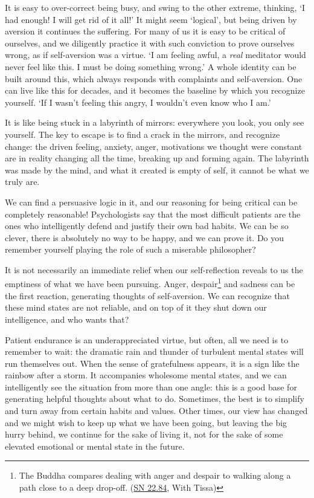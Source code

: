 It is easy to over-correct being busy, and swing to the other extreme,
thinking, `I had enough! I will get rid of it all!' It might seem
`logical', but being driven by aversion it continues the suffering. For
many of us it is easy to be critical of ourselves, and we diligently
practice it with such conviction to prove ourselves wrong, as if
self-aversion was a virtue. `I am feeling awful, a \emph{real} meditator
would never feel like this. I must be doing something wrong.' A whole
identity can be built around this, which always responds with complaints
and self-aversion. One can live like this for decades, and it becomes
the baseline by which you recognize yourself. `If I wasn't feeling this
angry, I wouldn't even know who I am.'

It is like being stuck in a labyrinth of mirrors: everywhere you look,
you only see yourself. The key to escape is to find a crack in the
mirrors, and recognize change: the driven feeling, anxiety, anger,
motivations we thought were constant are in reality changing all the
time, breaking up and forming again. The labyrinth was made by the mind,
and what it created is empty of self, it cannot be what we truly are.

We can find a persuasive logic in it, and our reasoning for being
critical can be completely reasonable! Psychologists say that the most
difficult patients are the ones who intelligently defend and justify
their own bad habits. We can be so clever, there is absolutely no way to
be happy, and we can prove it. Do you remember yourself playing the role
of such a miserable philosopher?

It is not necessarily an immediate relief when our self-reflection
reveals to us the emptiness of what we have been pursuing. Anger,
despair\footnote{The Buddha compares dealing with anger and despair to
  walking along a path close to a deep drop-off.
  (\href{https://suttacentral.net/sn22.84}{SN 22.84}, With Tissa)} and
sadness can be the first reaction, generating thoughts of self-aversion.
We can recognize that these mind states are not reliable, and on top of
it they shut down our intelligence, and who wants that?


Patient endurance is an underappreciated virtue, but often, all we need
is to remember to wait: the dramatic rain and thunder of turbulent
mental states will run themselves out. When the sense of gratefulness
appears, it is a sign like the rainbow after a storm. It accompanies
wholesome mental states, and we can intelligently see the situation from
more than one angle: this is a good base for generating helpful thoughts
about what to do. Sometimes, the best is to simplify and turn away from
certain habits and values. Other times, our view has changed and we
might wish to keep up what we have been going, but leaving the big hurry
behind, we continue for the sake of living it, not for the sake of some
elevated emotional or mental state in the future.

